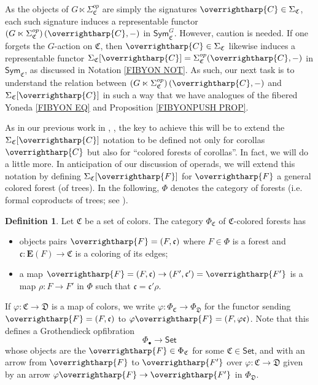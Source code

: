 \documentclass[a4paper,10pt
,draft
]{article}%
\numberwithin{equation}{section}
\numberwithin{figure}{section}
\theoremstyle{definition} %
\newtheorem{definition}[equation]{Definition}%
\newcommand{\vect}[1]{\text{\overrightharp{\ensuremath{#1}}}}
\newcommand{\1}{\ensuremath{\mathbbm 1}}%
\begin{document}
As the objects of 
$G \ltimes \Sigma^{op}_{\mathfrak{C}}$
are simply the signatures
$\vect{C} \in \Sigma_{\mathfrak{C}}$,
each such signature induces a representable functor
$\left(G \ltimes \Sigma^{op}_{\mathfrak{C}}\right)(\vect{C},-)$
in 
$\mathsf{Sym}^G_{\mathfrak{C}}$.
However, caution is needed.
If one forgets the $G$-action on $\mathfrak{C}$,
then $\vect{C} \in \Sigma_{\mathfrak{C}}$
likewise induces a representable functor 
$\Sigma_{\mathfrak{C}}[\vect{C}]=\Sigma^{op}_{\mathfrak{C}}(\vect{C},-)$
in $\mathsf{Sym}_{\mathfrak{C}}$,
as discussed in Notation \ref{FIBYON NOT}.
%
As such, our next task is to understand the relation between 
$\left(G \ltimes \Sigma^{op}_{\mathfrak{C}}\right)(\vect{C},-)$
and 
$\Sigma_{\mathfrak{C}}[\vect{C}]$
in such a way that we have analogues of the 
fibered Yoneda \eqref{FIBYON EQ}
and Proposition \ref{FIBYONPUSH PROP}.


As in our previous work in 
\cite[Not. 5.56]{Per18}, \cite[\S 2.3]{BP_edss},
the key to achieve this will be to extend the
$\Sigma_{\mathfrak{C}}[\vect{C}]$
notation to be defined not only for corollas $\vect{C}$
but also for ``colored forests of corollas''.
In fact, we will do a little more. 
In anticipation of our discussion of operads, 
we will extend this notation by defining 
$\Sigma_{\mathfrak{C}}[\vect{F}]$
for $\vect{F}$ a general colored forest (of trees).
In the following, $\Phi$ denotes the category of forests
(i.e. formal coproducts of trees; see \cite[\S 5.1]{Per18}).

\begin{definition}\label{COLFOR DEF}
	Let $\mathfrak{C}$ be a set of colors.
	The category $\Phi_{\mathfrak{C}}$ of $\mathfrak{C}$-colored forests has
	\begin{itemize}
		\item objects pairs
		$\vect{F} = (F,\mathfrak{c})$
		where 
		$F\in \Phi$ is a forest
		and 
		$\mathfrak{c}\colon \boldsymbol{E}(F) \to \mathfrak{C}$ 
		is a coloring of its edges;
		\item a map
		$\vect{F}=(F,\mathfrak{c}) \to 
		(F',\mathfrak{c}') = \vect{F'}$
		is a map $\rho \colon F \to F'$ in $\Phi$
		such that
		$\mathfrak{c} = \mathfrak{c}' \rho$.
	\end{itemize}
	If $\varphi\colon \mathfrak{C} \to \mathfrak{D}$ is a map of colors,
	we write
	$\varphi \colon \Phi_{\mathfrak{C}} \to \Phi_{\mathfrak{D}}$
	for the functor sending 
	$\vect{F} = (F,\mathfrak{c})$
	to 
	$\varphi\vect{F} = (F,\varphi\mathfrak{c})$.
	Note that this defines a Grothendieck opfibration
	\begin{equation}\label{PHIBGRO EQ}
	\Phi_{\bullet} \to \mathsf{Set}
	\end{equation}
	whose objects are the $\vect{F} \in \Phi_{\mathfrak{C}}$ for some
	$\mathfrak{C} \in \mathsf{Set}$,
	and with an arrow
	from $\vect{F}$ to $\vect{F'}$
	over
	$\varphi \colon \mathfrak{C} \to \mathfrak{D}$
	given by an arrow
	$\varphi \vect{F} \to \vect{F'}$ in $\Phi_{\mathfrak{D}}$.
\end{definition}
\end{document}
